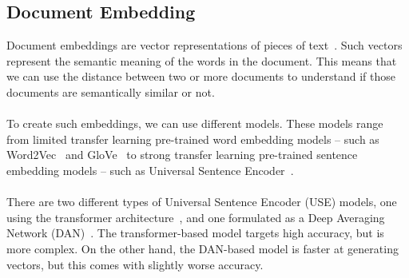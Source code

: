 \subsection{Document Embedding}\label{subsec:document-embedding}
Document embeddings are vector representations of pieces of text~\cite{dai_document_2015}.
Such vectors represent the semantic meaning of the words in the document.
This means that we can use the distance between two or more documents to understand if those documents are semantically similar or not. \\ \\
To create such embeddings, we can use different models.
These models range from limited transfer learning pre-trained word embedding models -- such as Word2Vec~\cite{mikolov_distributed_2013} and GloVe~\cite{pennington_glove_2014} to strong transfer learning pre-trained sentence embedding models -- such as Universal Sentence Encoder~\cite{cer_universal_2018}. \\ \\
There are two different types of Universal Sentence Encoder (USE) models, one using the transformer architecture~\cite{vaswani_attention_2017}, and one formulated as a Deep Averaging Network (DAN)~\cite{iyyer_deep_2015}.
The transformer-based model targets high accuracy, but is more complex.
On the other hand, the DAN-based model is faster at generating vectors, but this comes with slightly worse accuracy.